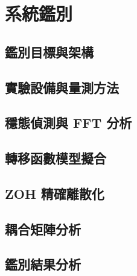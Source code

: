 \chapter{系統鑑別}
\label{c:identification}

\section{鑑別目標與架構}
\label{sec:id_objective}


\section{實驗設備與量測方法}
\label{sec:id_setup}


\section{穩態偵測與 FFT 分析}
\label{sec:steady_state_fft}


\section{轉移函數模型擬合}
\label{sec:tf_fitting}


\section{ZOH 精確離散化}
\label{sec:zoh_discretization}


\section{耦合矩陣分析}
\label{sec:coupling_matrix}


\section{鑑別結果分析}
\label{sec:id_results}

